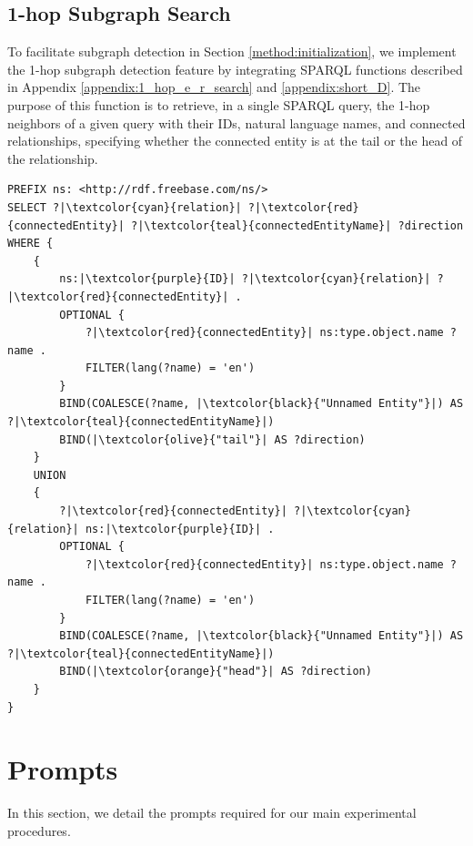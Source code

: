 \newpage
\subsection{1-hop Subgraph Search}
To facilitate subgraph detection in Section \ref{method:initialization}, we implement the 1-hop subgraph detection feature by integrating SPARQL functions described in Appendix \ref{appendix:1_hop_e_r_search} and \ref{appendix:short_D}. The purpose of this function is to retrieve, in a single SPARQL query, the 1-hop neighbors of a given query with their IDs, natural language names, and connected relationships, specifying whether the connected entity is at the tail or the head of the relationship.
\lstset{language=SPARQL}
\begin{lstlisting}
PREFIX ns: <http://rdf.freebase.com/ns/>
SELECT ?|\textcolor{cyan}{relation}| ?|\textcolor{red}{connectedEntity}| ?|\textcolor{teal}{connectedEntityName}| ?direction
WHERE {
    {
        ns:|\textcolor{purple}{ID}| ?|\textcolor{cyan}{relation}| ?|\textcolor{red}{connectedEntity}| .
        OPTIONAL {
            ?|\textcolor{red}{connectedEntity}| ns:type.object.name ?name .
            FILTER(lang(?name) = 'en')
        }
        BIND(COALESCE(?name, |\textcolor{black}{"Unnamed Entity"}|) AS ?|\textcolor{teal}{connectedEntityName}|)
        BIND(|\textcolor{olive}{"tail"}| AS ?direction)
    }
    UNION
    {
        ?|\textcolor{red}{connectedEntity}| ?|\textcolor{cyan}{relation}| ns:|\textcolor{purple}{ID}| .
        OPTIONAL {
            ?|\textcolor{red}{connectedEntity}| ns:type.object.name ?name .
            FILTER(lang(?name) = 'en')
        }
        BIND(COALESCE(?name, |\textcolor{black}{"Unnamed Entity"}|) AS ?|\textcolor{teal}{connectedEntityName}|)
        BIND(|\textcolor{orange}{"head"}| AS ?direction)
    }
}
\end{lstlisting}

\newpage
\onecolumn
\section{Prompts}\label{appendix:prompt}
In this section, we detail the prompts required for our main experimental procedures.

